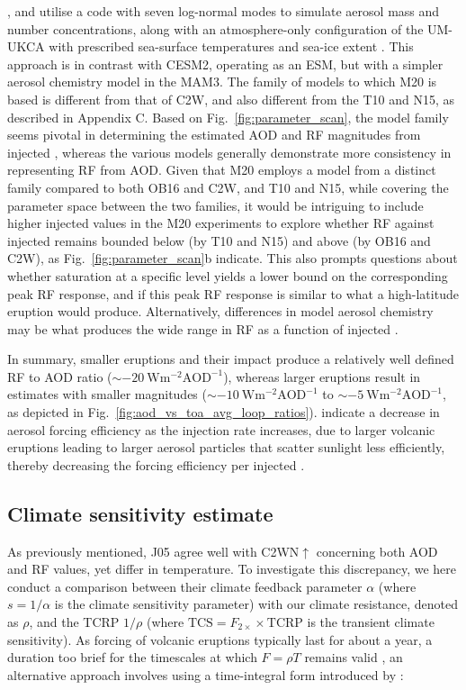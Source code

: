 \documentclass[draft]{agujournal2019}
\newcommand{\iso}[1][i]{{#1}njected \ce{SO2}}
\newcommand{\cws}{C2WN\(\uparrow\)}
\begin{document}
,  and  utilise a code with
seven log-normal modes to simulate aerosol mass and number concentrations, along with an
atmosphere-only configuration of the UM-UKCA with prescribed sea-surface temperatures
and sea-ice extent \cite{marshall2019}. This approach is in contrast with CESM2,
operating as an ESM, but with a simpler aerosol chemistry model in the MAM3. The family
of models to which M20 is based is different from that of C2W, and also different from
the T10 and N15, as described in Appendix C. Based on Fig.~\ref{fig:parameter_scan}, the
model family seems pivotal in determining the estimated AOD and RF magnitudes from
\iso{}, whereas the various models generally demonstrate more consistency in
representing RF from AOD. Given that M20 employs a model from a distinct family compared
to both OB16 and C2W, and T10 and N15, while covering the parameter space between the
two families, it would be intriguing to include higher \iso{} values in the M20
experiments to explore whether RF against \iso{} remains bounded below (by T10 and N15)
and above (by OB16 and C2W), as Fig.~\ref{fig:parameter_scan}b indicate. This also
prompts questions about whether  saturation at a specific level yields a lower
bound on the corresponding peak RF response, and if this peak RF response is similar to
what a high-latitude eruption would produce. Alternatively, differences in model aerosol
chemistry may be what produces the wide range in RF as a function of \iso{}.

In summary, smaller eruptions and their impact produce a relatively well defined RF to
AOD ratio (\(\sim \SI{-20}{\watt\metre^{-2}\mathrm{AOD}^{-1}}\)), whereas larger
eruptions result in estimates with smaller magnitudes (\(\sim
\SI{-10}{\watt\metre^{-2}\mathrm{AOD}^{-1}}\) to \(\sim
\SI{-5}{\watt\metre^{-2}\mathrm{AOD}^{-1}}\), as depicted in
Fig.~\ref{fig:aod_vs_toa_avg_loop_ratios}).  indicate a decrease in
aerosol forcing efficiency as the injection rate increases, due to larger volcanic
eruptions leading to larger aerosol particles that scatter sunlight less efficiently,
thereby decreasing the forcing efficiency per \iso{} \cite{english2013, timmreck2018}.

\subsection{Climate sensitivity estimate}

As previously mentioned, J05 agree well with \cws{} concerning both AOD and RF values,
yet differ in temperature. To investigate this discrepancy, we here conduct a comparison
between their climate feedback parameter \(\alpha \) (where \(s=1/\alpha \) is the
climate sensitivity parameter) with our climate resistance, denoted as \(\rho \), and
the TCRP \(1/\rho\) (where \(\mathrm{TCS}=F_{2\times}\times \mathrm{TCRP}\) is the
transient climate sensitivity). As forcing of volcanic eruptions typically last for
about a year, a duration too brief for the timescales at which \(F=\rho T\) remains
valid \cite{gregory2016}, an alternative approach involves using a time-integral form
introduced by :
\end{document}
